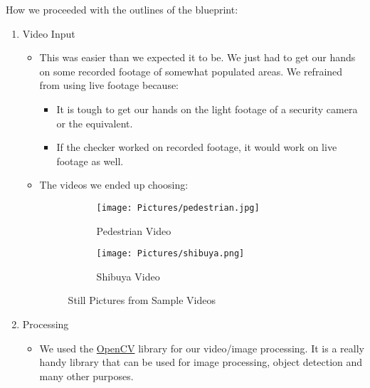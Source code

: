 \documentclass[a4paper]{article}
\begin{document}
How we proceeded with the outlines of the blueprint:

\begin{enumerate}
    \item Video Input
          \begin{itemize}[label={}]
              \item This was easier than we expected it to be. We just had to get our hands
                    on some recorded footage of somewhat populated areas. We refrained from using live
                    footage because:
                    \begin{itemize}
                        \item It is tough to get our hands on the light footage of a security camera or the equivalent.
                        \item If the checker worked on recorded footage, it would work on live footage as well.
                    \end{itemize}

              \item The videos we ended up choosing:
                    \begin{figure}[h!]
                        \centering
                        \begin{subfigure}[b]{0.4\linewidth}
                            \texttt{[image: Pictures/pedestrian.jpg]}
                            \caption{Pedestrian Video}
                        \end{subfigure}
                        \begin{subfigure}[b]{0.4\linewidth}
                            \texttt{[image: Pictures/shibuya.png]}
                            \caption{Shibuya Video}
                        \end{subfigure}
                        \caption{Still Pictures from Sample Videos}
                        \label{fig:stills}
                    \end{figure}
          \end{itemize}
          \pagebreak
    \item Processing
          \begin{itemize}[label={}]
              \item We used the \href{https://opencv.org/}{OpenCV} library for our video/image processing. It is a really handy library that can be used for image processing, object detection and many other purposes.
                    
          \end{itemize}


\end{enumerate}
\end{document}
